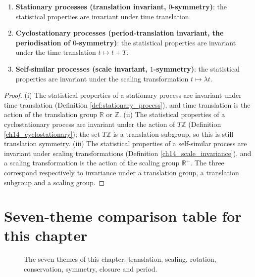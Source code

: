 \begin{proposition}\label{prop:three_symmetry_stochastic}
\begin{enumerate}[label=(\roman*)]
    \item \textbf{Stationary processes (translation invariant, $0$-symmetry)}: the statistical properties are invariant under time translation.
    \item \textbf{Cyclostationary processes (period-translation invariant, the periodisation of $0$-symmetry)}: the statistical properties are invariant under the time translation $t \mapsto t + T$.
    \item \textbf{Self-similar processes (scale invariant, $1$-symmetry)}: the statistical properties are invariant under the scaling transformation $t \mapsto \lambda t$.
\end{enumerate}
\end{proposition}

\begin{proof}
(i) The statistical properties of a stationary process are invariant under time translation (Definition \ref{def:stationary_process}), and time translation is the action of the translation group $\mathbb{R}$ or $\mathbb{Z}$. (ii) The statistical properties of a cyclostationary process are invariant under the action of $T\mathbb{Z}$ (Definition \ref{ch14_cyclostationary}); the set $T\mathbb{Z}$ is a translation subgroup, so this is still translation symmetry. (iii) The statistical properties of a self-similar process are invariant under scaling transformations (Definition \ref{ch14_scale_invariance}), and a scaling transformation is the action of the scaling group $\mathbb{R}^+$. The three correspond respectively to invariance under a translation group, a translation subgroup and a scaling group.
\end{proof}

\section*{Seven-theme comparison table for this chapter}

\begin{figure}[htbp]
\centering
{}
\caption{The seven themes of this chapter: translation, scaling, rotation, conservation, symmetry, closure and period.}
\label{fig:probability_themes}
\end{figure}

